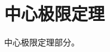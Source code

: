 \documentclass[../../main.tex]{subfiles}
\begin{document}
\section{中心极限定理}
中心极限定理部分。
\end{document}

